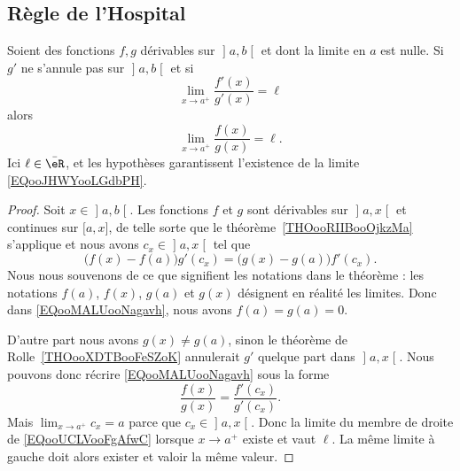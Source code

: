 \subsection{Règle de l'Hospital}

\begin{proposition}     \label{PROPooBZHTooHmyGsy}
Soient des fonctions \( f,g\) dérivables sur \( \mathopen] a , b \mathclose[\) et dont la limite en \( a\) est nulle. Si \( g'\) ne s'annule pas sur \( \mathopen] a , b \mathclose[\) et si
    \begin{equation}
        \lim_{x\to a^+} \frac{ f'(x) }{ g'(x) }=\ell
    \end{equation}
    alors
    \begin{equation}        \label{EQooJHWYooLGdbPH}
        \lim_{x\to a^+} \frac{ f(x) }{ g(x) }=\ell.
    \end{equation}
    Ici \( \ell\in \bar \eR\), et les hypothèses garantissent l'existence de la limite \eqref{EQooJHWYooLGdbPH}.
\end{proposition}

\begin{proof}
Soit \( x\in\mathopen] a , b \mathclose[\). Les fonctions \( f\) et \( g\) sont dérivables sur \( \mathopen] a , x \mathclose[\) et continues sur \( \mathopen[ a , x \mathclose]\), de telle sorte que le théorème~\ref{THOooRIIBooOjkzMa} s'applique et nous avons \( c_x\in \mathopen] a , x \mathclose[\) tel que
    \begin{equation}        \label{EQooMALUooNagavh}
        \big( f(x)-f(a) \big)g'(c_x)=\big( g(x)-g(a) \big)f'(c_x).
    \end{equation}
    Nous nous souvenons de ce que signifient les notations dans le théorème : les notations \( f(a)\), \( f(x)\), \( g(a)\) et \( g(x)\) désignent en réalité les limites. Donc dans \eqref{EQooMALUooNagavh}, nous avons \( f(a)=g(a)=0\).

D'autre part nous avons \( g(x)\neq g(a)\), sinon le théorème de Rolle~\ref{THOooXDTBooFeSZoK} annulerait \( g'\) quelque part dans \( \mathopen] a , x \mathclose[\). Nous pouvons donc récrire \eqref{EQooMALUooNagavh} sous la forme
    \begin{equation}        \label{EQooUCLVooFgAfwC}
        \frac{ f(x) }{ g(x) }=\frac{ f'(c_x) }{ g'(c_x) }.
    \end{equation}
Mais \( \lim_{x\to a^+} c_x=a\) parce que \( c_x\in\mathopen] a , x \mathclose[\). Donc la limite du membre de droite de \eqref{EQooUCLVooFgAfwC} lorsque \( x\to a^+\) existe et vaut \( \ell\). La même limite à gauche doit alors exister et valoir la même valeur.
\end{proof}

